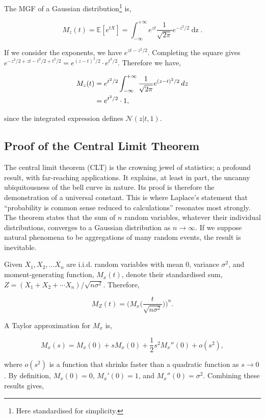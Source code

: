 \documentclass[11pt]{amsart}
\begin{document}
The MGF of a Gaussian distribution\footnote{Here standardised for simplicity.} is,

$$M_z(t) = \mathbb{E}[e^{tX}] = \int_{-\infty}^{+\infty}e^{zt}\frac{1}{\sqrt{2\pi}}e^{-z^2/2}\mathop{dz}.$$

If we consider the exponents, we have $e^{zt - z^2/2}$. Completing the square gives $e^{-z^2/2 + zt - t^2/2 + t^2/2} = e^{(z-t)^2/2}\cdot e^{t^2/2}$. Therefore we have,

\begin{align}
M_z(t) &= e^{t^2/2}\int_{-\infty}^{+\infty}\frac{1}{\sqrt{2\pi}}e^{(z-t)^2/2}\mathop{dz} \notag \\
&= e^{t^2/2} \cdot 1, \notag
\end{align}

since the integrated expression defines $\mathcal{N}(z | t, 1)$. 

\subsection{Proof of the Central Limit Theorem}

The central limit theorem (CLT) is the crowning jewel of statistics; a profound result, with far-reaching applications. It explains, at least in part, the uncanny ubiquitousness of the bell curve in nature. Its proof is therefore the demonstration of a universal constant. This is where Laplace's statement that ``probability is common sense reduced to calculations'' resonates most strongly. The theorem states that the sum of $n$ random variables, whatever their individual distributions, converges to a Gaussian distribution as $n \to \infty$. If we suppose natural phenomena to be aggregations of many random events, the result is inevitable.

Given $X_1, X_2, ... X_n$ are i.i.d. random variables with mean 0, variance $\sigma^2$, and moment-generating function, $M_x(t)$, denote their standardised sum, $Z = (X_1 + X_2 + \cdots X_n)/\sqrt{n\sigma^2}$. Therefore,

$$M_Z(t) = \Bigg(M_x\Bigg(\frac{t}{\sqrt{n\sigma^2}}\Bigg)\Bigg)^n.$$

A Taylor approximation for $M_x$ is,

$$M_x(s) = M_x(0) + sM_x(0) + \frac{1}{2}s^2M_x''(0) + o(s^2),$$

where $o(s^2)$ is a function that shrinks faster than a quadratic function as $s \to 0$. By definition, $M_x(0) = 0$, $M_x'(0) = 1$, and $M_x''(0) = \sigma^2$. Combining these results gives,
\end{document}
